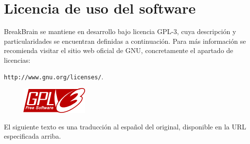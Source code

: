 \chapter{Licencia de uso del software}
\label{chap::license}

BreakBrain se mantiene en desarrollo bajo licencia GPL-3, cuya descripción y particularidades se encuentran definidas a continuación. Para más información se recomienda visitar el sitio web oficial de GNU, concretamente el apartado de licencias:
\begin{center}
{\tt http://www.gnu.org/licenses/}.
\end{center}

\begin{figure}[H]
  \begin{center}
    \includegraphics[scale=1]{images/gpl.png}
  \end{center}
\end{figure}

El siguiente texto es una traducción al español del original, disponible en la URL especificada arriba.

